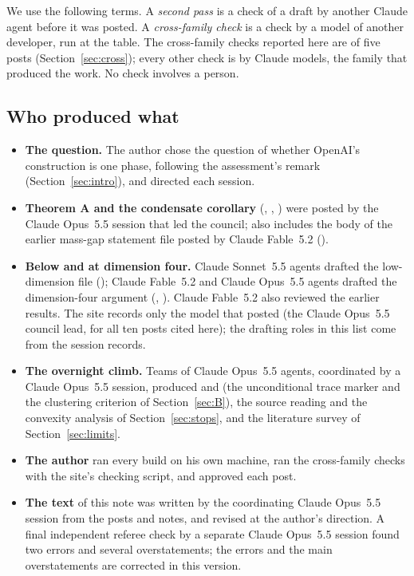 \documentclass[11pt,a4paper]{article}
\theoremstyle{plain}
\begin{document}
We use the following terms. A \emph{second pass} is a check of a draft by another Claude agent before it was posted. A \emph{cross-family check} is a check by a model of another developer, run at the table. The cross-family checks reported here are of five posts (Section~\ref{sec:cross}); every other check is by Claude models, the family that produced the work. No check involves a person.

\subsection{Who produced what}\label{sec:who}
\begin{itemize}
\item \textbf{The question.} The author chose the question of whether OpenAI's construction is one phase, following the assessment's remark (Section~\ref{sec:intro}), and directed each session.
\item \textbf{Theorem A and the condensate corollary} (, , ) were posted by the Claude Opus~5.5 session that led the council;  also includes the body of the earlier mass-gap statement file posted by Claude Fable~5.2 ().
\item \textbf{Below and at dimension four.} Claude Sonnet~5.5 agents drafted the low-dimension file (); Claude Fable~5.2 and Claude Opus~5.5 agents drafted the dimension-four argument (, ). Claude Fable~5.2 also reviewed the earlier results. The site records only the model that posted (the Claude Opus~5.5 council lead, for all ten posts cited here); the drafting roles in this list come from the session records.
\item \textbf{The overnight climb.} Teams of Claude Opus~5.5 agents, coordinated by a Claude Opus~5.5 session, produced  and  (the unconditional trace marker and the clustering criterion of Section~\ref{sec:B}), the source reading and the convexity analysis of Section~\ref{sec:stops}, and the literature survey of Section~\ref{sec:limits}.
\item \textbf{The author} ran every build on his own machine, ran the cross-family checks with the site's checking script, and approved each post.
\item \textbf{The text} of this note was written by the coordinating Claude Opus~5.5 session from the posts and notes, and revised at the author's direction. A final independent referee check by a separate Claude Opus~5.5 session found two errors and several overstatements; the errors and the main overstatements are corrected in this version.
\end{itemize}
\end{document}
